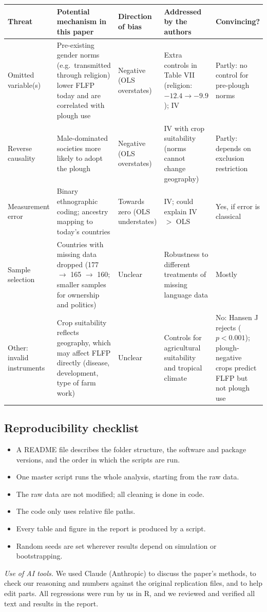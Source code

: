 \documentclass[12pt,a4paper]{article}
\renewcommand{\arraystretch}{1.25}
\begin{document}
{\renewcommand{\arraystretch}{1.4}%
\begin{tabularx}{\textwidth}{@{}>{\raggedright\arraybackslash}p{}
  L
  >{\raggedright\arraybackslash}p{0.13\textwidth}
  L
  >{\raggedright\arraybackslash}p{0.14\textwidth}@{}}
\toprule
Threat & Potential mechanism in this paper & Direction of bias & Addressed by the authors & Convincing? \\
\midrule
Omitted variable(s) & Pre-existing gender norms (e.g.\ transmitted through religion) lower FLFP today and are correlated with plough use & Negative (OLS overstates) & Extra controls in Table VII (religion: $-12.4 \to -9.9$); IV & Partly: no control for pre-plough norms \\
Reverse causality & Male-dominated societies more likely to adopt the plough & Negative (OLS overstates) & IV with crop suitability (norms cannot change geography) & Partly: depends on exclusion restriction \\
Measurement error & Binary ethnographic coding; ancestry mapping to today's countries & Towards zero (OLS understates) & IV; could explain IV $>$ OLS & Yes, if error is classical \\
Sample selection & Countries with missing data dropped (177 $\to$ 165 $\to$ 160; smaller samples for ownership and politics) & Unclear & Robustness to different treatments of missing language data & Mostly \\
Other: invalid instruments & Crop suitability reflects geography, which may affect FLFP directly (disease, development, type of farm work) & Unclear & Controls for agricultural suitability and tropical climate & No: Hansen J rejects ($p < 0.001$); plough-negative crops predict FLFP but not plough use \\
\bottomrule
\end{tabularx}}

\subsection{Reproducibility checklist}

\begin{itemize}[label=$\square$, leftmargin=*, itemsep=2pt]
  \item A README file describes the folder structure, the software and package versions, and the order in which the scripts are run.
  \item One master script runs the whole analysis, starting from the raw data.
  \item The raw data are not modified; all cleaning is done in code.
  \item The code only uses relative file paths.
  \item Every table and figure in the report is produced by a script.
  \item Random seeds are set wherever results depend on simulation or bootstrapping.
\end{itemize}

\textit{Use of AI tools.} We used Claude (Anthropic) to discuss the paper's methods, to check our reasoning and numbers against the original replication files, and to help edit parts. All regressions were run by us in R, and we reviewed and verified all text and results in the report.
\end{document}
